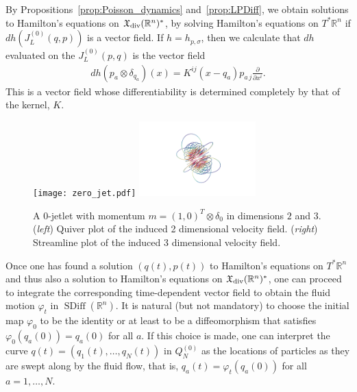 \documentclass[12pt]{amsart}
\newcommand{\pder}[2]{\ensuremath{\frac{\partial #1}{\partial #2}}}
\newcommand{\R}{\ensuremath{\mathbb{R}}}
\DeclareMathOperator{\SDiff}{SDiff}
\begin{document}
By Propositions~\ref{prop:Poisson_dynamics} and~\ref{prop:LPDiff},
we obtain solutions to Hamilton's equations
on $\mathfrak{X}_{\rm div}(\R^n)^*$, by solving
Hamilton's equations on $T^*\R^n$ if $dh( J_L^{(0)}(q,p) )$ is
a vector field.  If $h = h_{p,\sigma}$, then we calculate that $dh$
evaluated on the $J_L^{(0)}(p,q)$ is the vector field
\begin{align*}
	dh( p_a \otimes \delta_{q_a} )  (x) = K^{ij}(x - q_a) p_{a\,j} \pder{}{x^i}.
\end{align*}
This is a vector field whose differentiability is determined completely by that of
the kernel, $K$.
\begin{figure}
	\centering
	\texttt{[image: zero\_jet.pdf]}
	\includegraphics[width = 0.4\textwidth]{zero_jet_3D.png}
	\caption{A $0$-jetlet with momentum $m = (1,0)^T \otimes \delta_0$ in dimensions $2$ and $3$.
	(\emph{left}) Quiver plot of the induced 2 dimensional velocity field.
	(\emph{right})  Streamline plot of the induced 3 dimensional velocity field. }
	\label{fig:zero_jetlet}
\end{figure}
Once one has found a solution $(q(t), p(t))$ to Hamilton's equations on $T^*\mathbb{R}^n$ and thus also a solution to Hamilton's equations on $\mathfrak{X}_{\rm div}(\mathbb{R}^n)^*$, one can proceed to integrate the corresponding time-dependent vector field to obtain the fluid motion $\varphi_t$ in $\SDiff(\mathbb{R}^n)$. It is natural (but not mandatory) to choose the initial map $\varphi_0$ to be the identity or at least to be a diffeomorphism that satisfies $\varphi_0(q_a(0))= q_a(0)$ for all $a$.
  If this choice is made, one can interpret the curve $q(t) = (q_1(t), \ldots, q_N(t))$ in $Q_N^{(0)}$ as the locations of particles as they are swept along by the fluid flow, that is, $q_a(t) = \varphi_t(q_a(0))$ for all $a = 1, \ldots, N$. 
  
\end{document}
